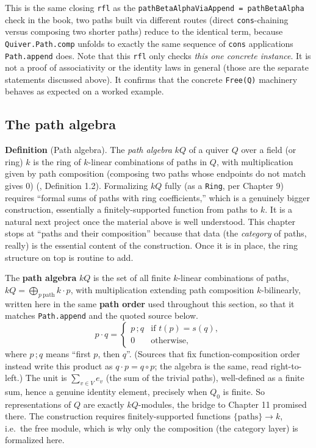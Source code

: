 This is the same closing \texttt{rfl} as the \texttt{pathBetaAlphaViaAppend = pathBetaAlpha} check in the book, two paths built via different routes (direct \texttt{cons}-chaining versus composing two shorter paths) reduce to the identical term, because \texttt{Quiver.Path.comp} unfolds to exactly the same sequence of \texttt{cons} applications \texttt{Path.append} does. Note that this \texttt{rfl} only checks \emph{this one concrete instance}. It is not a proof of associativity or the identity laws in general (those are the separate statements discussed above). It confirms that the concrete \texttt{Free(Q)} machinery behaves as expected on a worked example.

\subsection{The path algebra}\label{sec:12-path-algebras:05-path-composition:3}

\textbf{Definition} (Path algebra). The \emph{path algebra} \(kQ\) of a quiver \(Q\) over a field (or ring) \(k\) is the ring of \(k\)-linear combinations of paths in \(Q\), with multiplication given by path composition (composing two paths whose endpoints do not match gives \(0\)) (\cite{AssemSimsonSkowronski2006}, Definition 1.2). Formalizing \(kQ\) fully (as a \texttt{Ring}, per Chapter 9) requires ``formal sums of paths with ring coefficients,'' which is a genuinely bigger construction, essentially a finitely-supported function from paths to \(k\). It is a natural next project once the material above is well understood. This chapter stops at ``paths and their composition'' because that data (the \emph{category} of paths, really) is the essential content of the construction. Once it is in place, the ring structure on top is routine to add.

\begin{mathreading}

The \textbf{path algebra} \(kQ\) is the set of all finite \(k\)-linear combinations of paths, \(kQ = \bigoplus_{p\ \text{path}} k\cdot p\), with multiplication extending path composition \(k\)-bilinearly, written here in the same \textbf{path order} used throughout this section, so that it matches \texttt{Path.append} and the quoted source below. \[
p \cdot q = \begin{cases} p\,;q & \text{if } t(p) = s(q),\\ 0 &
\text{otherwise,}\end{cases}
\] where \(p\,;q\) means ``first \(p\), then \(q\)''. (Sources that fix function-composition order instead write this product as \(q \cdot p = q \circ
p\); the algebra is the same, read right-to-left.) The unit is \(\sum_{v\in V} e_v\) (the sum of the trivial paths), well-defined as a finite sum, hence a genuine identity element, precisely when \(Q_0\) is finite. So representations of \(Q\) are exactly \(kQ\)-modules, the bridge to Chapter 11 promised there. The construction requires finitely-supported functions \(\{\text{paths}\} \to k\), i.e.~the free module, which is why only the composition (the category layer) is formalized here.

\end{mathreading}

